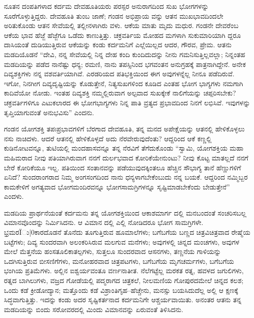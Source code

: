 ನೂತನ ದಂಪತಿಗಳಾದ ಕರ್ದಮ ದೇವಹೂತಿಯರು ಪರಸ್ಪರ ಅನುರಾಗದಿಂದ ಸುಖ ಭೋಗಗಳನ್ನು ಸೂರೆಗೊಳ್ಳುತ್ತಿದ್ದರು. ದೇವಹೂತಿ ತುಂಬ ಜಾಣೆ; ಗಂಡನ ಅಭಿಪ್ರಾಯ ವನ್ನು ಆತನ ಮುಖಭಾವದಿಂದಲೇ ಅರಿತುಕೊಂಡು ಆತನ ಸೇವೆಯಲ್ಲಿ ತಲ್ಲೀನಳಾಗಿರು ವಳು. ಆಕೆಯ ಮಾತು ಮೃದು ಮಧುರ. ಗಂಡನೇ ದೇವರೆಂಬ ಆಕೆಯ ಭಾವ ಹೆಜ್ಜೆ ಹೆಜ್ಜೆಗೂ ಒಡೆದು ಕಾಣುತ್ತಿತ್ತು. ಚಕ್ರವರ್ತಿಯ ಮೋಹದ ಮಗಳಾಗಿ ಸುಕುಮಾರಿಯಾಗಿ ದ್ದರೂ ದಾಸಿಯಂತೆ ದುಡಿಯುತ್ತಿರುವ ಆಕೆಯನ್ನು ಕಂಡು ಕರ್ದಮನಿಗೆ ಎಲ್ಲೆಯಿಲ್ಲದ ಆದರ, ಗೌರವ, ಪ್ರೇಮ. ಆತನು ಮಡದಿಯೊಡನೆ “ದೇವಿ, ನನ್ನ ಸೇವೆಯಲ್ಲಿ ನಿನ್ನ ದೇಹ ಕಂದಿ ಕುಂದಿದುದನ್ನು ನೀನು ಗಮನಿಸುತ್ತಿಲ್ಲವಲ್ಲಾ; ನಿನ್ನಂತಹ ಮಡದಿಯನ್ನು ಪಡೆದ ನಾನೆಷ್ಟು ಧನ್ಯ; ರಮಣಿ, ನಾನು ತಪಸ್ಸಿನಿಂದ ಭಗವಂತನ ಅನುಗ್ರಹಕ್ಕೆ ಪಾತ್ರನಾಗಿದ್ದೇನೆ. ಅನೇಕ ದಿವ್ಯಶಕ್ತಿಗಳು ನನ್ನ ವಶವರ್ತಿಯಾಗಿವೆ. ಎರಡರಿಯದ ಪತಿಭಕ್ತಿಯಿಂದ ಈಗ ಅವುಗಳನ್ನೆಲ್ಲ ನೀನೂ ಪಡೆದಿರುವೆ. ಇಗೋ, ನಿನಗೀಗ ದಿವ್ಯದೃಷ್ಟಿಯನ್ನು ಕೊಡುತ್ತೇನೆ, ನಿತ್ಯಸುಖಗಳಿಂದ ಕೂಡಿದ ಎಂತಹ ಭೋಗ ಭಾಗ್ಯಗಳು ನಮಗಾಗಿ ಕಾದಿವೆಯೋ ನೋಡು. ಇಂತಹ ದಿವ್ಯಶಕ್ತಿ ನಮ್ಮಲ್ಲಿರುವಾಗ ಅಲ್ಪವಾದ ಸುಖಕ್ಕೇಕೆ ನಾಲಿಗೆಯನ್ನು ಚಪ್ಪರಿಸಬೇಕು? ಚಕ್ರವರ್ತಿಗಳಿಗೂ ಎಟುಕಲಾರದ ಈ ಭೋಗಭಾಗ್ಯಗಳು ನಿನ್ನ ಪಾತಿ ವ್ರತ್ಯದ ಪ್ರಭಾವದಿಂದ ನಿನಗೆ ಲಭಿಸಿವೆ. ಇವುಗಳನ್ನು ತೃಪ್ತಿಯಾಗುವಂತೆ ಅನುಭವಿಸು” ಎಂದನು. 

ಗಂಡನ ಯೋಗಶಕ್ತಿ ತಪಃಪ್ರಭಾವಗಳಿಗೆ ಬೆರಗಾದ ದೇವಹೂತಿ, ತನ್ನ ಮನದ ಅಪೇಕ್ಷೆಯನ್ನು ಆತನಲ್ಲಿ ಹೇಳಿಕೊಳ್ಳಲು ನಸು ನಾಚಿದಳು. ಆದರೆ ಆತನಲ್ಲಿ ಹೇಳಿಕೊಳ್ಳದೆ ಅದು ನೆರವೇರುವುದೆಂತು? ಆದ್ದರಿಂದ ಆಕೆ ಕಣ್ಣಲ್ಲಿ ಕುಡಿನೋಟವನ್ನೂ, ತುಟಿಯಲ್ಲಿ ಮಂದಹಾಸವನ್ನೂ ತನ್ನ ನೆರವಿಗೆ ತೆಗೆದುಕೊಂಡು “ಸ್ವಾಮಿ, ಯೋಗಶಕ್ತಿಯ ಮಹಾ ಮಹಿಮರಾದ ನೀವು ಪತಿಯಾಗಿರುವಾಗ ನನಗೆ ದುರ್ಲಭವಾದ ಕೋರಿಕೆಯೇನುಂಟು? ನೀವು ಕೊಟ್ಟ ಮಾತಲ್ಲದೆ ನನಗೆ ಬೇರೆ ಕೋರಿಕೆಯೂ ಇಲ್ಲ. ಪತಿಯಿಂದ ಸಂತಾನವನ್ನು ಪಡೆಯುವುದಕ್ಕಿಂತಲೂ ಹೆಚ್ಚಿನ ಸೌಭಾಗ್ಯ ತಾನೆ ಹೆಣ್ಣುಗಳಿಗೆ ಏನಿದೆ? ಸುಂದರಾಂಗರಾದ ನಿಮ್ಮ ಅಂಗಸಂಗದಿಂದ ನಾನು ಧನ್ಯಳಾಗಬೇಕೆಂಬುದು ನನ್ನ ಬಯಕೆ. ಆದ್ದರಿಂದ ನಮ್ಮಿಬ್ಬರ ಕಾಮಕೇಳಿಗೆ ಅಗತ್ಯವಾದ ಭೋಗಮಂದಿರವನ್ನೂ ಭೋಗಸಾಮಗ್ರಿಗಳನ್ನೂ ಸೃಷ್ಟಿಮಾಡಬೇಕೆಂದು ಬೇಡುತ್ತೇನೆ” ಎಂದಳು.

ಮಡದಿಯ ಪ್ರಾರ್ಥನೆಯಂತೆ ಕರ್ದಮನು ತನ್ನ ಯೋಗಶಕ್ತಿಯಿಂದ ಆಕಾಶಮಾರ್ಗ ದಲ್ಲಿ ಮನಬಂದಂತೆ ಸಂಚರಿಸಬಲ್ಲ ವಿಮಾನವೊಂದನ್ನು ನಿರ್ಮಿಸಿದನು. ಆ ವಿಮಾನ ದಲ್ಲಿ ಎಲ್ಲಿ ನೋಡಿದರೂ ಭೋಗ ಸಾಮಗ್ರಿಗಳೇ. ಭ್ರಮರÏು|0ಕಾರದೊಡನೆ ತೊನೆದು ತೂಗುತ್ತಿರುವ ಹೂಮಾಲೆಗಳು; ಬಗೆಬಗೆಯ ಬಣ್ಣದ ಚಿತ್ರವಿಚಿತ್ರವಾದ ರೇಷ್ಮೆಯ ಬಟ್ಟೆಗಳು; ದಿವ್ಯ ಸುಂದರವಾಗಿ ಅಲಂಕರಿಸಿರುವ ಮಲಗುವ ಮನೆಗಳು; ಅವುಗಳಲ್ಲಿ ಚಿನ್ನದ ಮಂಚಗಳು, ಅವುಗಳ ಮೇಲೆ ಮೆತ್ತನೆಯ ಹಂಸತೂಲಿಕಾತಲ್ಪಗಳು, ಸುತ್ತಲೂ ಸುಂದರವಾದ ಆಸನಗಳು, ತಣ್ಣನೆಯ ಗಾಳಿಯನ್ನು ಒದಗಿಸುತ್ತಿರುವ ಬೀಸಣಿಗೆಗಳು, ಮನೋಹರವಾದ ಚಿತ್ರಪಟಗಳು, ಬಗೆಬಗೆಯ ಮೃಗಚರ್ಮಗಳು, ಬಗೆಬಗೆಯ ಭಂಗಿಯ ಪ್ರತಿಮೆಗಳು. ಅಲ್ಲಿನ ಐಶ್ವರ್ಯವಂತೂ ವರ್ಣನಾತೀತ. ನೆಲೆಗಟ್ಟೆಲ್ಲ ಮರಕತ ರತ್ನ, ಹವಳದ ಜಗುಲಿಗಳು, ರತ್ನದ ಬಾಗಿಲುಗಳು, ವಜ್ರದ ಗೋಡೆಯಲ್ಲಿ ಪದ್ಮರಾಗದ ಚಿತ್ರಕಲೆ, ನೀಲಮಣಿಯ ಗೋಪುರದಮೇಲೆ ಚಿನ್ನದ ಕಲಶ; ಒಂದು ಕಡೆ ಕ್ರೀಡೋದ್ಯಾನ; ಮತ್ತೊಂದು ಕಡೆ ವಿಶ್ರಾಂತಿಗೃಹ–ಹೆಚ್ಚೇನು, ಮನಸ್ಸು ಬಯಸಿದುದೆಲ್ಲ ಅಲ್ಲಿ ಆ ಕ್ಷಣಕ್ಕೆ ಸಿದ್ಧವಾಗುತ್ತಿತ್ತು. ಇದನ್ನು ಕಂಡು ಅದರ ಸೃಷ್ಟಿಕರ್ತನಾದ ಕರ್ದಮನಿಗೇ ಆಶ್ಚರ್ಯವಾಯಿತು. ಅನಂತರ ಆತನು ತನ್ನ ಮಡದಿಯನ್ನು ಬಿಂದು ಸರೋವರದಲ್ಲಿ ಮಿಂದು ವಿಮಾನವನ್ನು ಏರುವಂತೆ ತಿಳಿಸಿದನು.

